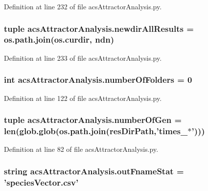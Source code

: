 Definition at line 232 of file acs\-Attractor\-Analysis.\-py.

\hypertarget{a00091_ae620f985669aed90dc070824420d4b5e}{
\subsubsection[{newdir\-All\-Results}]{\setlength{\rightskip}{0pt plus 5cm}tuple acs\-Attractor\-Analysis.\-newdir\-All\-Results = os.\-path.\-join(os.\-curdir, {\bf ndn})}}\label{a00091_ae620f985669aed90dc070824420d4b5e}


Definition at line 233 of file acs\-Attractor\-Analysis.\-py.

\hypertarget{a00091_aa5d2495d08b8ad5ebf34f85d5417e93c}{
\subsubsection[{number\-Of\-Folders}]{\setlength{\rightskip}{0pt plus 5cm}int acs\-Attractor\-Analysis.\-number\-Of\-Folders = 0}}\label{a00091_aa5d2495d08b8ad5ebf34f85d5417e93c}


Definition at line 122 of file acs\-Attractor\-Analysis.\-py.

\hypertarget{a00091_ac014a9b46a060e4fed96eaee9614345b}{
\subsubsection[{number\-Of\-Gen}]{\setlength{\rightskip}{0pt plus 5cm}tuple acs\-Attractor\-Analysis.\-number\-Of\-Gen = len(glob.\-glob(os.\-path.\-join({\bf res\-Dir\-Path},'times\-\_\-$\ast$')))}}\label{a00091_ac014a9b46a060e4fed96eaee9614345b}


Definition at line 82 of file acs\-Attractor\-Analysis.\-py.

\hypertarget{a00091_aeecfcdefbc44b2b2ceff4c9b6f737f27}{
\subsubsection[{out\-Fname\-Stat}]{\setlength{\rightskip}{0pt plus 5cm}string acs\-Attractor\-Analysis.\-out\-Fname\-Stat = 'species\-Vector.\-csv'}}\label{a00091_aeecfcdefbc44b2b2ceff4c9b6f737f27}


